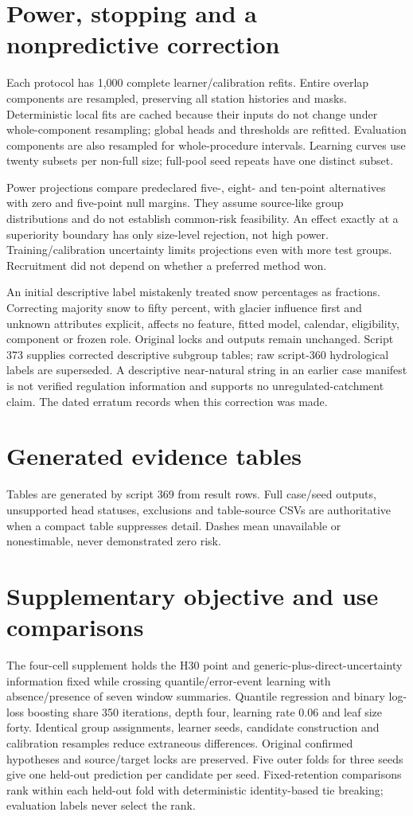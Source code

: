 \documentclass[draft]{agujournal2025}
\begin{document}
\section{Power, stopping and a nonpredictive correction}
Each protocol has 1,000 complete learner/calibration refits. Entire overlap components are resampled, preserving all station histories and masks. Deterministic local fits are cached because their inputs do not change under whole-component resampling; global heads and thresholds are refitted. Evaluation components are also resampled for whole-procedure intervals. Learning curves use twenty subsets per non-full size; full-pool seed repeats have one distinct subset.

Power projections compare predeclared five-, eight- and ten-point alternatives with zero and five-point null margins. They assume source-like group distributions and do not establish common-risk feasibility. An effect exactly at a superiority boundary has only size-level rejection, not high power. Training/calibration uncertainty limits projections even with more test groups. Recruitment did not depend on whether a preferred method won.

An initial descriptive label mistakenly treated snow percentages as fractions. Correcting majority snow to fifty percent, with glacier influence first and unknown attributes explicit, affects no feature, fitted model, calendar, eligibility, component or frozen role. Original locks and outputs remain unchanged. Script 373 supplies corrected descriptive subgroup tables; raw script-360 hydrological labels are superseded. A descriptive near-natural string in an earlier case manifest is not verified regulation information and supports no unregulated-catchment claim. The dated erratum records when this correction was made.

\section{Generated evidence tables}
Tables are generated by script 369 from result rows. Full case/seed outputs, unsupported head statuses, exclusions and table-source CSVs are authoritative when a compact table suppresses detail. Dashes mean unavailable or nonestimable, never demonstrated zero risk.


\section{Supplementary objective and use comparisons}
The four-cell supplement holds the H30 point and generic-plus-direct-uncertainty information fixed while crossing quantile/error-event learning with absence/presence of seven window summaries. Quantile regression and binary log-loss boosting share 350 iterations, depth four, learning rate 0.06 and leaf size forty. Identical group assignments, learner seeds, candidate construction and calibration resamples reduce extraneous differences. Original confirmed hypotheses and source/target locks are preserved. Five outer folds for three seeds give one held-out prediction per candidate per seed. Fixed-retention comparisons rank within each held-out fold with deterministic identity-based tie breaking; evaluation labels never select the rank.
\end{document}
